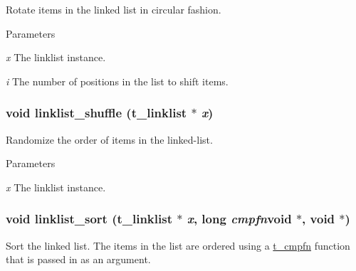 Rotate items in the linked list in circular fashion. 
\begin{DoxyParams}{Parameters}
\item[{\em x}]The linklist instance. \item[{\em i}]The number of positions in the list to shift items. \end{DoxyParams}
\hypertarget{group__linklist_ga58a2e5fba8b3b084a3940a23fbd3a4a1}{
\subsubsection[{linklist\_\-shuffle}]{\setlength{\rightskip}{0pt plus 5cm}void linklist\_\-shuffle ({\bf t\_\-linklist} $\ast$ {\em x})}}
\label{group__linklist_ga58a2e5fba8b3b084a3940a23fbd3a4a1}


Randomize the order of items in the linked-\/list. 
\begin{DoxyParams}{Parameters}
\item[{\em x}]The linklist instance. \end{DoxyParams}
\hypertarget{group__linklist_gaf01b5f67a8ceccdd75cff34f6ecdd8c2}{
\subsubsection[{linklist\_\-sort}]{\setlength{\rightskip}{0pt plus 5cm}void linklist\_\-sort ({\bf t\_\-linklist} $\ast$ {\em x}, \/  long  {\em cmpfn}void $\ast$, void $\ast$)}}
\label{group__linklist_gaf01b5f67a8ceccdd75cff34f6ecdd8c2}


Sort the linked list. The items in the list are ordered using a \hyperlink{group__datastore_gaaf4ae6dd800a2be9abd645cf70aeb38f}{t\_\-cmpfn} function that is passed in as an argument.


